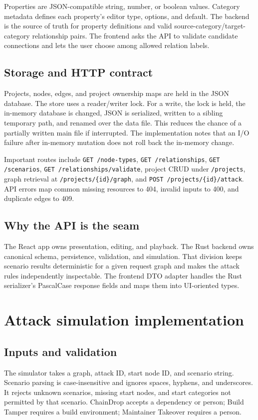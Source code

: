 \documentclass[11pt,oneside]{book}
\newcommand{\code}[1]{\texttt{\small #1}}
\begin{document}
Properties are JSON-compatible string, number, or boolean values. Category metadata defines each property's editor type, options, and default. The backend is the source of truth for property definitions and valid source-category/target-category relationship pairs. The frontend asks the API to validate candidate connections and lets the user choose among allowed relation labels.

\section{Storage and HTTP contract}
Projects, nodes, edges, and project ownership maps are held in the JSON database. The store uses a reader/writer lock. For a write, the lock is held, the in-memory database is changed, JSON is serialized, written to a sibling temporary path, and renamed over the data file. This reduces the chance of a partially written main file if interrupted. The implementation notes that an I/O failure after in-memory mutation does not roll back the in-memory change.

Important routes include \code{GET /node-types}, \code{GET /relationships}, \code{GET /scenarios}, \code{GET /relationships/validate}, project CRUD under \code{/projects}, graph retrieval at \code{/projects/\{id\}/graph}, and \code{POST /projects/\{id\}/attack}. API errors map common missing resources to 404, invalid inputs to 400, and duplicate edges to 409.

\section{Why the API is the seam}
The React app owns presentation, editing, and playback. The Rust backend owns canonical schema, persistence, validation, and simulation. That division keeps scenario results deterministic for a given request graph and makes the attack rules independently inspectable. The frontend DTO adapter handles the Rust serializer's PascalCase response fields and maps them into UI-oriented types.

\chapter{Attack simulation implementation}
\section{Inputs and validation}
The simulator takes a graph, attack ID, start node ID, and scenario string. Scenario parsing is case-insensitive and ignores spaces, hyphens, and underscores. It rejects unknown scenarios, missing start nodes, and start categories not permitted by that scenario. ChainDrop accepts a dependency or person; Build Tamper requires a build environment; Maintainer Takeover requires a person.
\end{document}
